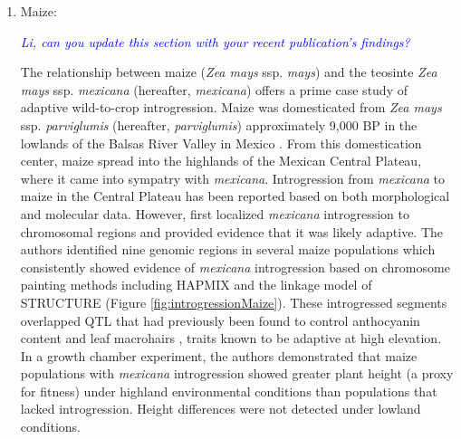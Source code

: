 \documentclass[11pt]{article}
\newcommand{\gmj}[1]{\textcolor{blue}{ \emph{\scriptsize  #1}} } %
\begin{document}
\begin{enumerate}
\item{Maize:}

\gmj{Li, can you update this section with your recent publication's findings?}

The relationship between maize (\emph{Zea mays} ssp. \emph{mays}) and the teosinte \emph{Zea mays} ssp. \emph{mexicana} (hereafter, \emph{mexicana}) offers a prime case study of adaptive wild-to-crop introgression.
Maize was domesticated from \emph{Zea mays} ssp. \emph{parviglumis} (hereafter, \emph{parviglumis})  approximately 9,000 BP in the lowlands of the Balsas River Valley in Mexico \cite{matsuoka2002single}.
From this domestication center, maize spread into the highlands of the Mexican Central Plateau, where it came into sympatry with \emph{mexicana}.
Introgression from \emph{mexicana} to maize in the Central Plateau has been reported based on both morphological \cite {wilkes1977} and molecular \cite{vanHeerwaarden2011, doebley1987} data.
However, \citep{hufford2013} first localized \emph{mexicana} introgression to chromosomal regions and provided evidence that it was likely adaptive.
The authors identified nine genomic regions in several maize populations which consistently showed evidence of \emph{mexicana} introgression based on chromosome painting methods including HAPMIX and the linkage model of STRUCTURE (Figure \ref{fig:introgressionMaize}).
These introgressed segments overlapped QTL that had previously been found to control anthocyanin content and leaf macrohairs \cite{lauter2004}, traits known to be adaptive at high elevation.
In a growth chamber experiment, the authors demonstrated that maize populations with \emph{mexicana} introgression showed greater plant height (a proxy for fitness) under highland environmental conditions than populations that lacked introgression.
Height differences were not detected under lowland conditions.



\end{enumerate}
\end{document}
